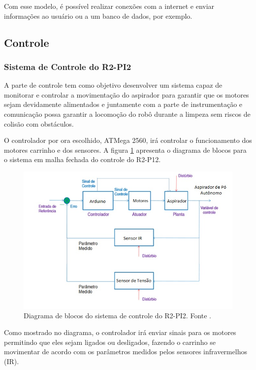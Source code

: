   Com esse modelo, é possível realizar conexões com a internet e enviar informações ao usuário ou a um banco de dados, por exemplo.

\subsection{Controle} %
	\label{sub:controle}

		\subsubsection{Sistema de Controle do R2-PI2}

			A parte de controle tem como objetivo desenvolver um sistema capaz de monitorar e controlar a movimentação do aspirador para garantir que os motores sejam devidamente alimentados e juntamente com a parte de instrumentação e comunicação possa garantir a locomoção do robô durante a limpeza sem riscos de colisão com obstáculos.

			O controlador por ora escolhido, ATMega 2560, irá controlar o funcionamento dos motores carrinho e dos sensores. A figura \ref{img:diagrama_sistema_controle} apresenta o diagrama de blocos para o sistema em malha fechada do controle do R2-P12.

			\begin{figure}[H]
				\centering
				\includegraphics[scale=0.55]{figuras/diagrama_blocos_R2PI2.png}
				\caption{Diagrama de blocos do sistema de controle do R2-PI2. Fonte \cite{mello}.}
				\label{img:diagrama_sistema_controle}
			\end{figure}

			Como mostrado no diagrama, o controlador irá enviar sinais para os motores permitindo que eles sejam ligados ou desligados, fazendo o carrinho se movimentar de acordo com os parâmetros medidos pelos sensores infravermelhos (IR). 


